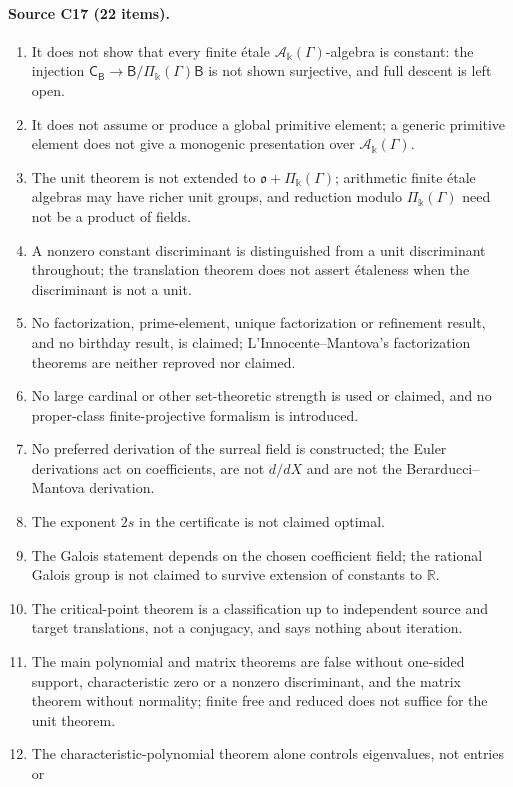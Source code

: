 \documentclass[11pt,oneside]{article}
\numberwithin{equation}{section}
\theoremstyle{definition}
\theoremstyle{remark}
\newcommand{\R}{\mathbb R}
\newcommand{\crA}{\mathcal A_\Bbbk(\Gamma)}
\newcommand{\crP}{\Pi_\Bbbk(\Gamma)}
\begin{document}
\paragraph{Source C17 (22 items).}
\begin{enumerate}[leftmargin=*,itemsep=1pt]
\item It does not show that every finite \'etale $\crA$-algebra is constant: the injection
$\mathsf C_{\mathsf B}\to\mathsf B/\crP\mathsf B$ is not shown surjective, and full descent is
left open.
\item It does not assume or produce a global primitive element; a generic primitive element
does not give a monogenic presentation over $\crA$.
\item The unit theorem is not extended to $\mathfrak o+\crP$; arithmetic finite \'etale
algebras may have richer unit groups, and reduction modulo $\crP$ need not be a product of
fields.
\item A nonzero constant discriminant is distinguished from a unit discriminant throughout;
the translation theorem does not assert \'etaleness when the discriminant is not a unit.
\item No factorization, prime-element, unique factorization or refinement result, and no
birthday result, is claimed; L'Innocente--Mantova's factorization theorems are neither
reproved nor claimed.
\item No large cardinal or other set-theoretic strength is used or claimed, and no
proper-class finite-projective formalism is introduced.
\item No preferred derivation of the surreal field is constructed; the Euler derivations act
on coefficients, are not $d/dX$ and are not the Berarducci--Mantova derivation.
\item The exponent $2s$ in the certificate is not claimed optimal.
\item The Galois statement depends on the chosen coefficient field; the rational Galois group
is not claimed to survive extension of constants to $\R$.
\item The critical-point theorem is a classification up to independent source and target
translations, not a conjugacy, and says nothing about iteration.
\item The main polynomial and matrix theorems are false without one-sided support,
characteristic zero or a nonzero discriminant, and the matrix theorem without normality;
finite free and reduced does not suffice for the unit theorem.
\item The characteristic-polynomial theorem alone controls eigenvalues, not entries or

\end{enumerate}
\end{document}
